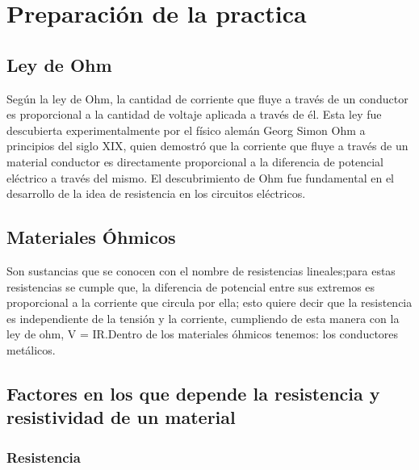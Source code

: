 \documentclass[letterpaper, 12pt]{report}
\begin{document}
\newpage

\section{Preparación de la practica}

\subsection{Ley de Ohm}

Según la ley de Ohm, la cantidad de corriente que fluye a través de un
conductor es proporcional a la cantidad de voltaje aplicada a través de
él. Esta ley fue descubierta experimentalmente por el físico alemán Georg
Simon Ohm a principios del siglo XIX, quien demostró que la corriente que
fluye a través de un material conductor es directamente proporcional a la
diferencia de potencial eléctrico a través del mismo. El descubrimiento de
Ohm fue fundamental en el desarrollo de la idea de resistencia en los
circuitos eléctricos.~\cite{LeyDeOhm}

\subsection{Materiales Óhmicos}

Son sustancias que se conocen con el nombre de resistencias lineales;para estas
resistencias se cumple que, la diferencia de potencial entre sus extremos es
proporcional a la corriente que circula por ella; esto quiere decir que la
resistencia es independiente de la tensión y la corriente, cumpliendo de esta
manera con la ley de ohm, V = IR.\@ Dentro de los materiales óhmicos tenemos:
los conductores metálicos.~\cite{MaterialesOhmicos}



\subsection{Factores en los que depende la resistencia y resistividad de un
	material}

\subsubsection*{Resistencia}
\end{document}
